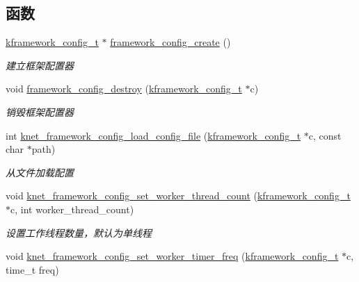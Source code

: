 \subsection*{函数}
\begin{DoxyCompactItemize}
\item 
\hyperlink{a00056_adeaf952e0f0887507ff836385bf54874_adeaf952e0f0887507ff836385bf54874}{kframework\+\_\+config\+\_\+t} $\ast$ \hyperlink{a00060_abb53b259903568ee8684e2979d5419cb_abb53b259903568ee8684e2979d5419cb}{framework\+\_\+config\+\_\+create} ()
\begin{DoxyCompactList}\small\item\em 建立框架配置器 \end{DoxyCompactList}\item 
void \hyperlink{a00060_a94f3ef660e9dd4e8c9b4a4f113c35833_a94f3ef660e9dd4e8c9b4a4f113c35833}{framework\+\_\+config\+\_\+destroy} (\hyperlink{a00056_adeaf952e0f0887507ff836385bf54874_adeaf952e0f0887507ff836385bf54874}{kframework\+\_\+config\+\_\+t} $\ast$c)
\begin{DoxyCompactList}\small\item\em 销毁框架配置器 \end{DoxyCompactList}\item 
int \hyperlink{a00115_ga45b64d2f395031b60dd33412f55242b4_ga45b64d2f395031b60dd33412f55242b4}{knet\+\_\+framework\+\_\+config\+\_\+load\+\_\+config\+\_\+file} (\hyperlink{a00056_adeaf952e0f0887507ff836385bf54874_adeaf952e0f0887507ff836385bf54874}{kframework\+\_\+config\+\_\+t} $\ast$c, const char $\ast$path)
\begin{DoxyCompactList}\small\item\em 从文件加载配置 \end{DoxyCompactList}\item 
void \hyperlink{a00115_ga470f4acf8c70060852d435753375fa3b_ga470f4acf8c70060852d435753375fa3b}{knet\+\_\+framework\+\_\+config\+\_\+set\+\_\+worker\+\_\+thread\+\_\+count} (\hyperlink{a00056_adeaf952e0f0887507ff836385bf54874_adeaf952e0f0887507ff836385bf54874}{kframework\+\_\+config\+\_\+t} $\ast$c, int worker\+\_\+thread\+\_\+count)
\begin{DoxyCompactList}\small\item\em 设置工作线程数量，默认为单线程 \end{DoxyCompactList}\item 
void \hyperlink{a00115_ga42497b09d9d0c4039a062ff750ead0a9_ga42497b09d9d0c4039a062ff750ead0a9}{knet\+\_\+framework\+\_\+config\+\_\+set\+\_\+worker\+\_\+timer\+\_\+freq} (\hyperlink{a00056_adeaf952e0f0887507ff836385bf54874_adeaf952e0f0887507ff836385bf54874}{kframework\+\_\+config\+\_\+t} $\ast$c, time\+\_\+t freq)

\end{DoxyCompactItemize}

